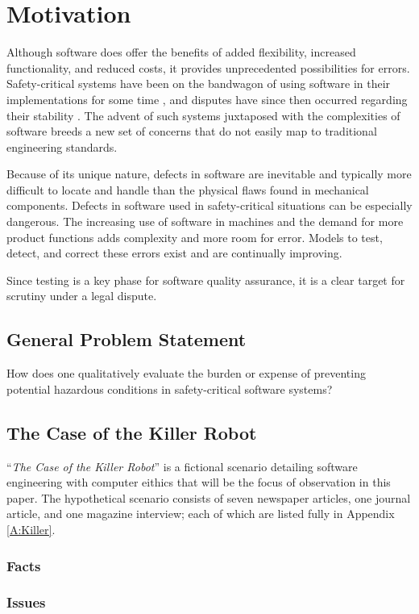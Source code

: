 \chapter{Motivation}\label{C:Motivation}

Although software does offer the benefits of added flexibility, increased
functionality, and reduced costs, it provides unprecedented possibilities for
errors. Safety-critical systems have been on the bandwagon of using software in
their implementations for some time \cite{Graupe78,Hurtig94}, and disputes have
since then occurred regarding their stability \cite{Leveson93,Maisel05}. The 
advent of such systems juxtaposed with the complexities of software breeds a new
set of concerns that do not easily map to traditional engineering standards.

Because of its unique nature, defects in software are inevitable and typically
more difficult to locate and handle than the physical flaws found in mechanical
components. Defects in software used in safety-critical situations can be
especially dangerous. The increasing use of software in machines and the demand
for more product functions adds complexity and more room for error. Models to
test, detect, and correct these errors exist and are continually improving.

Since testing is a key phase for software quality assurance, it is a clear
target for scrutiny under a legal dispute.

\section{General Problem Statement}
How does one qualitatively evaluate the burden or expense of preventing
potential hazardous conditions in safety-critical software systems?

\section{The Case of the Killer Robot}
``\textit{The Case of the Killer Robot}'' \cite{Epstein96} is a fictional  
scenario detailing software engineering with computer eithics that will be the
focus of observation in this paper. The hypothetical scenario consists of seven
newspaper articles, one journal article, and one magazine interview; each of
which are listed fully in Appendix \ref{A:Killer}.

\subsection{Facts}

\subsection{Issues}
